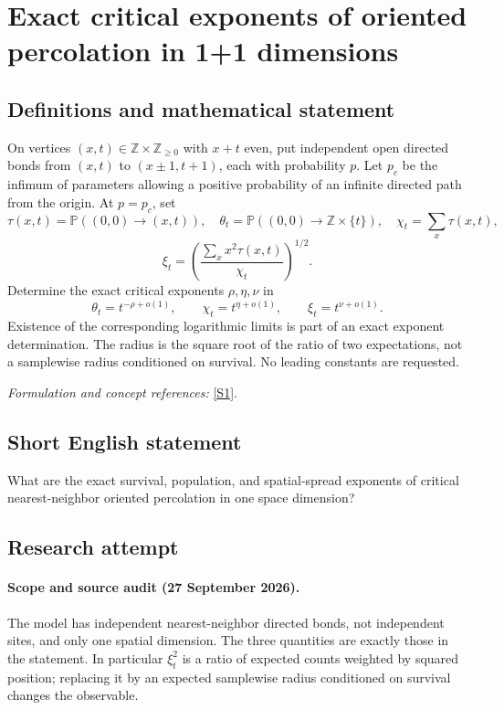 \documentclass[11pt]{article}
\begin{document}
\section*{\texorpdfstring{Exact critical exponents of oriented percolation in 1+1 dimensions}{Exact critical exponents of oriented percolation in 1+1 dimensions}}\label{statement}
\subsection{Definitions and mathematical statement}
On vertices $(x,t)\in{\mathbb{Z}}\times{\mathbb{Z}}_{\ge0}$ with $x+t$ even, put independent open directed bonds from $(x,t)$ to $(x\pm1,t+1)$, each with probability $p$. Let $p_c$ be the infimum of parameters allowing a positive probability of an infinite directed path from the origin. At $p=p_c$, set
\[
 \tau(x,t)={\mathbb{P}}((0,0)\to(x,t)),\quad
 \theta_t={\mathbb{P}}((0,0)\to{\mathbb{Z}}\times\{t\}),\quad
 \chi_t=\sum_x\tau(x,t),
\]
\[
 \xi_t=\left(\frac{\sum_xx^2\tau(x,t)}{\chi_t}\right)^{1/2}.
\]
Determine the exact critical exponents $\rho,\eta,\nu$ in
\[
 \theta_t=t^{-\rho+o(1)},\qquad
 \chi_t=t^{\eta+o(1)},\qquad \xi_t=t^{\nu+o(1)}.
\]
Existence of the corresponding logarithmic limits is part of an exact exponent determination. The radius is the square root of the ratio of two expectations, not a samplewise radius conditioned on survival. No leading constants are requested.
\par\smallskip\textit{Formulation and concept references:} \href{https://arxiv.org/abs/1709.08291}{[S1]}.

\subsection{Short English statement}
What are the exact survival, population, and spatial-spread exponents of critical nearest-neighbor oriented percolation in one space dimension?
\subsection{Research attempt}
\paragraph{Scope and source audit (27 September 2026).}
The model has independent nearest-neighbor directed bonds, not independent
sites, and only one spatial dimension. The three quantities are exactly
those in the statement. In particular $\xi_t^2$ is a ratio of expected
counts weighted by squared position; replacing it by an expected samplewise
radius conditioned on survival changes the observable.
\end{document}
